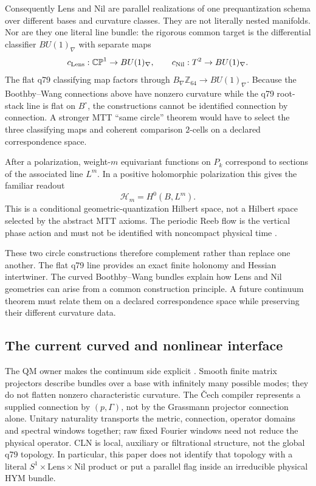 \documentclass[11pt]{article}
\begin{document}
Consequently Lens and Nil are parallel realizations of one prequantization
schema over different bases and curvature classes. They are not literally
nested manifolds. Nor are they one literal line bundle: the rigorous common
target is the differential classifier $BU(1)_\nabla$ with separate maps
\[
 c_{\rm Lens}:\mathbb{CP}^1\to BU(1)_\nabla,
 \qquad
 c_{\rm Nil}:T^2\to BU(1)_\nabla.
\]
The flat q79 classifying map factors through
$B_\nabla\mathbb Z_{64}\to BU(1)_\nabla$. Because the Boothby--Wang
connections above have nonzero curvature while the q79 root-stack line is
flat on $B^\circ$, the constructions cannot be identified connection by
connection. A stronger MTT ``same circle'' theorem would have to select the
three classifying maps and coherent comparison $2$-cells on a declared
correspondence space.

After a polarization, weight-$m$ equivariant functions on $P_k$ correspond to
sections of the associated line $L^m$. In a positive holomorphic polarization
this gives the familiar readout
\[
 \mathcal H_m=H^0(B,L^m).
\]
This is a conditional geometric-quantization Hilbert space, not a Hilbert
space selected by the abstract MTT axioms. The periodic Reeb flow is the
vertical phase action and must not be identified with noncompact physical
time \cite{Woodhouse}.

These two circle constructions therefore complement rather than replace one
another. The flat q79 line provides an exact finite holonomy and Hessian
intertwiner. The curved Boothby--Wang bundles explain how Lens and Nil
geometries can arise from a common construction principle. A future continuum
theorem must relate them on a declared correspondence space while preserving
their different curvature data.

\subsection{The current curved and nonlinear interface}
\label{sec:consumer-geometry}
The QM owner makes the continuum side explicit
\cite{QMGeometry,FrozenProjective,FrozenCech}. Smooth finite matrix
projectors describe bundles over a base with infinitely many possible modes;
they do not flatten nonzero characteristic curvature. The \v{C}ech compiler
represents a supplied connection by $(p,\Gamma)$, not by the Grassmann
projector connection alone. Unitary naturality transports the metric,
connection, operator domains and spectral windows together; raw fixed Fourier
windows need not reduce the physical operator. CLN is local, auxiliary or
filtrational structure, not the global q79 topology. In particular, this
paper does not identify that topology with a literal
$S^1\times\mathrm{Lens}\times\mathrm{Nil}$ product or put a parallel flag
inside an irreducible physical HYM bundle.
\end{document}
